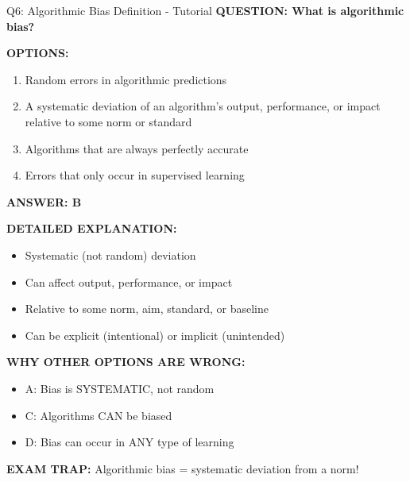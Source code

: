 \documentclass[8pt]{beamer}
\begin{document}
	\begin{frame}{Q6: Algorithmic Bias Definition - Tutorial}
		\fontsize{6.5}{7.5}\selectfont
		\textbf{QUESTION: What is algorithmic bias?}
		
		\vspace{0.1cm}
		\textbf{OPTIONS:}
		\begin{enumerate}
			\item Random errors in algorithmic predictions
			\item A systematic deviation of an algorithm's output, performance, or impact relative to some norm or standard
			\item Algorithms that are always perfectly accurate
			\item Errors that only occur in supervised learning
		\end{enumerate}
		
		\vspace{0.1cm}
		\textcolor{myblue}{\textbf{ANSWER: B}}
		
		\vspace{0.1cm}
		\textbf{DETAILED EXPLANATION:}
		\begin{itemize}
			\item Systematic (not random) deviation
			\item Can affect output, performance, or impact
			\item Relative to some norm, aim, standard, or baseline
			\item Can be explicit (intentional) or implicit (unintended)
		\end{itemize}
		
		\vspace{0.1cm}
		\textcolor{myred}{\textbf{WHY OTHER OPTIONS ARE WRONG:}}
		\begin{itemize}
			\item \textcolor{myred}{A:} Bias is SYSTEMATIC, not random
			\item \textcolor{myred}{C:} Algorithms CAN be biased
			\item \textcolor{myred}{D:} Bias can occur in ANY type of learning
		\end{itemize}
		
		\textcolor{myred}{\textbf{EXAM TRAP:}} Algorithmic bias = \textcolor{myblue}{systematic deviation from a norm}!
	\end{frame}
	
\end{document}
